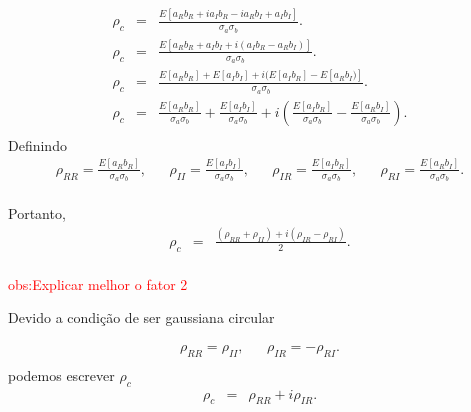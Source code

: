 \documentclass[10pt,a4paper]{article}
\begin{document}
\begin{equation}\label{sec1eqn14}
\begin{array}{ccc}
	\rho_c&=&\frac{E[a_{R}b_{R}+ia_{I}b_{R}-ia_{R}b_{I}+a_{I}b_{I}]}{\sigma_a\sigma_b}. \\
	\rho_c&=&\frac{E[a_{R}b_{R}+a_{I}b_{I}+i(a_{I}b_{R}-a_{R}b_{I})]}{\sigma_a\sigma_b}. \\
	\rho_c&=&\frac{E[a_{R}b_{R}]+E[a_{I}b_{I}]+i(E[a_{I}b_{R}]-E[a_{R}b_{I})]}{\sigma_a\sigma_b}. \\
	\rho_c&=&\frac{E[a_{R}b_{R}]}{\sigma_a\sigma_b}+\frac{E[a_{I}b_{I}]}{\sigma_a\sigma_b}+i\left(\frac{E[a_{I}b_{R}]}{\sigma_a\sigma_b}-\frac{E[a_{R}b_{I}]}{\sigma_a\sigma_b}\right). \\
\end{array}
\end{equation}
Definindo
\begin{equation}\label{sec1eqn15}
\begin{array}{ccccccccc}
	\rho_{RR}=\frac{E[a_{R}b_{R}]}{\sigma_a\sigma_b},&&\rho_{II}=\frac{E[a_{I}b_{I}]}{\sigma_a\sigma_b},&&\rho_{IR}=\frac{E[a_{I}b_{R}]}{\sigma_a\sigma_b},&&\rho_{RI}=\frac{E[a_{R}b_{I}]}{\sigma_a\sigma_b}. \\
\end{array}
\end{equation}

Portanto, 
\begin{equation}\label{sec1eqn16}
\begin{array}{ccc}
	\rho_c&=&\frac{(\rho_{RR}+\rho_{II})+i(\rho_{IR}-\rho_{RI})}{2}. \\
\end{array}
\end{equation}

\textcolor{red}{obs:Explicar melhor o fator 2}

Devido a condição de ser gaussiana circular

\begin{equation}\label{sec1eqn17}
\begin{array}{ccc}
	\rho_{RR}=\rho_{II},&&\rho_{IR}=-\rho_{RI}. \\
\end{array}
\end{equation}
podemos escrever $\rho_c$
\begin{equation}\label{sec1eqn18}
\begin{array}{ccc}
	\rho_c&=&\rho_{RR}+i\rho_{IR}. \\
\end{array}
\end{equation}
\end{document}

